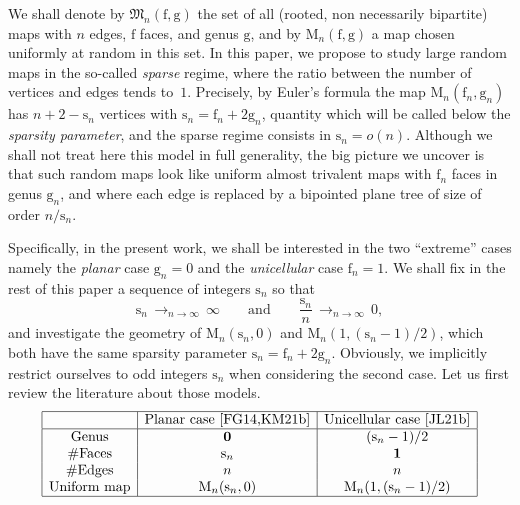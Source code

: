 \documentclass[10pt]{amsart}
\theoremstyle{plain}
\theoremstyle{definition}
\theoremstyle{remark}
\newcommand{\Map}{\mathrm{M}}
\newcommand{\face}{\mathrm{f}}
\newcommand{\gen}{\mathrm{g}}
\newcommand{\spar}{\mathrm{s}}
\newcommand{\cv}[1][n]{\,\mathop{\longrightarrow}^{}_{#1 \to \infty}\,}
\begin{document}
We shall denote by $\mathfrak{M}_n{(\face,\gen)}$ the set of all (rooted, non necessarily bipartite) maps with $n$ edges, $ \face$ faces, and genus $ \gen$, and by $ \Map_n{(\face,\gen)}$ a map chosen uniformly at random in this set. In this paper, we propose to study large random maps in the so-called \emph{sparse} regime, where the ratio between the number of vertices and edges tends to~$1$. Precisely, by Euler's formula the map $ \Map_n(\face_n, \gen_n)$ has $n+2- \spar_n$ vertices with $\spar_n = \face_n + 2 \gen_n$, quantity which will be called below the \emph{sparsity parameter}, and the sparse regime consists in $\spar_n = o(n)$.
Although we shall not treat here this model in full generality, the big picture we uncover is that such random maps look like uniform almost trivalent maps with $\face_n$ faces in genus $ \gen_n$, and where each edge is replaced by a bipointed plane tree of size of order $n/\spar_n$.

Specifically, in the present work, we shall be interested in the two ``extreme'' cases namely the \emph{planar} case $ \gen_n=0$ and the \emph{unicellular} case $ \face_n = 1$. We shall fix in the rest of this paper a sequence of integers $\spar_n$ so that
\begin{equation}\label{eq:standing}
\spar_n \cv \infty \qquad \text{and} \qquad \frac{\spar_n}{n} \cv 0,
\end{equation}
and investigate the geometry of $ \Map_n{(\spar_n,0)}$ and $ \Map_n{(1, (\spar_n-1)/2)}$, which both have the same sparsity parameter $\spar_n = \face_n + 2 \gen_n$.
Obviously, we implicitly restrict ourselves to odd integers $\spar_n$ when considering the second case.
Let us first review the literature about those models.
\[
\begin{array}{|c|c|c|}
\hline
& \mbox{Planar case~\cite{FG14,KM21b}} & \mbox{Unicellular case~\cite{JL21b}} \\
\hline
\mbox{Genus} & \mathbf{0} & (\spar_n-1)/2 \\
\#\mbox{Faces} & \spar_n & \mathbf{1} \\
\#\mbox{Edges} & n & n \\
\mbox{Uniform map} & \Map_n(\spar_n,0) & \displaystyle \Map_n(1, (\spar_n-1)/2)\\
\hline
\end{array}
\]
\end{document}
